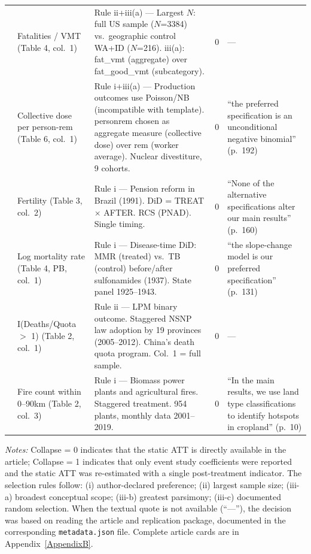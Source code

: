 \begin{small}
\begin{longtable}{p{2.2cm} p{3.0cm} p{5.5cm} p{0.8cm} p{4cm}}
\textcite{deangelo2014life}
& Fatalities / VMT (Table 4, col.~1)
& Rule ii+iii(a) --- Largest $N$: full US sample ($N$=3384) vs.\ geographic control WA+ID ($N$=216). iii(a): fat\_vmt (aggregate) over fat\_good\_vmt (subcategory).
& 0
& --- \\

\textcite{hausman2014corporate}
& Collective dose per person-rem (Table 6, col.~1)
& Rule i+iii(a) --- Production outcomes use Poisson/NB (incompatible with template). personrem chosen as aggregate measure (collective dose) over rem (worker average). Nuclear divestiture, 9 cohorts.
& 0
& ``the preferred specification is an unconditional negative binomial'' (p.~192) \\

\textcite{danzer2023pensions}
& Fertility (Table 3, col.~2)
& Rule i --- Pension reform in Brazil (1991). DiD = TREAT $\times$ AFTER. RCS (PNAD). Single timing.
& 0
& ``None of the alternative specifications alter our main results'' (p.~160) \\

\textcite{jayachandran2010modern}
& Log mortality rate (Table 4, PB, col.~1)
& Rule i --- Disease-time DiD: MMR (treated) vs.\ TB (control) before/after sulfonamides (1937). State panel 1925--1943.
& 0
& ``the slope-change model is our preferred specification'' (p.~131) \\

\textcite{fisman2017distortionary}
& I(Deaths/Quota $>$ 1) (Table 2, col.~1)
& Rule ii --- LPM binary outcome. Staggered NSNP law adoption by 19 provinces (2005--2012). China's death quota program. Col.~1 = full sample.
& 0
& --- \\

\textcite{cao2023mitigating}
& Fire count within 0--90km (Table 2, col.~3)
& Rule i --- Biomass power plants and agricultural fires. Staggered treatment. 954 plants, monthly data 2001--2019.
& 0
& ``In the main results, we use land type classifications to identify hotspots in cropland'' (p.~10) \\

\end{longtable}
\end{small}

\medskip\noindent
\textit{Notes:} Collapse = 0 indicates that the static ATT is directly available in the article; Collapse = 1 indicates that only event study coefficients were reported and the static ATT was re-estimated with a single post-treatment indicator. The selection rules follow: (i) author-declared preference; (ii) largest sample size; (iii-a) broadest conceptual scope; (iii-b) greatest parsimony; (iii-c) documented random selection. When the textual quote is not available (``---''), the decision was based on reading the article and replication package, documented in the corresponding \texttt{metadata.json} file. Complete article cards are in Appendix~\ref{AppendixB}.
